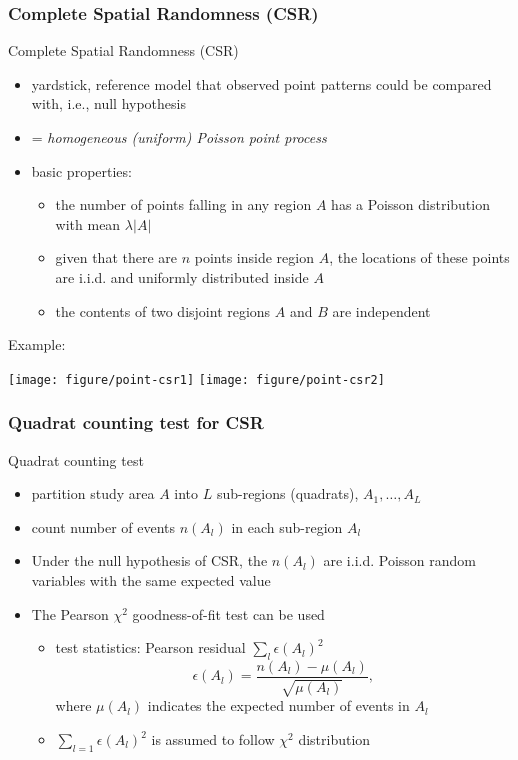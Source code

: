 \documentclass[10pt]{beamer}\usepackage[]{graphicx}\usepackage[]{color}
\newcommand{\bitemize}{\begin{itemize}}
\newcommand{\eitemize}{\end{itemize}}
\newcommand{\bblock}{\begin{block}}
\newcommand{\eblock}{\end{block}}
\begin{document}
\begin{frame}
\frametitle{Complete Spatial Randomness (CSR)}

\bblock{Complete Spatial Randomness (CSR)}
\bitemize
\item yardstick, reference model that observed point patterns could be compared with, i.e., null hypothesis
\item = {\it homogeneous (uniform) Poisson point process} 
\item basic properties:
\bitemize
\item the number of points falling in any region $A$ has a Poisson distribution with mean $\lambda|A|$
\item given that there are $n$ points inside region $A$, the locations of these points are i.i.d. and uniformly distributed inside $A$
\item the contents of two disjoint regions $A$ and $B$ are independent 
\eitemize
\eitemize
\eblock
\bblock{Example:}
\vspace{-0.5cm}


{\centering \texttt{[image: figure/point-csr1]} 
\texttt{[image: figure/point-csr2]} 

}




\eblock

\end{frame}

\begin{frame}
\frametitle{Quadrat counting test for CSR}

\bblock{Quadrat counting test}
\bitemize
\item partition study area $A$ into $L$ sub-regions (quadrats), $A_1, \ldots, A_L$ 
\item count number of events $n(A_l)$ in each sub-region $A_l$
\item Under the null hypothesis of CSR, the $n(A_l)$ are i.i.d. Poisson random variables with the same expected value
\item The Pearson $\chi^2$ goodness-of-fit test can be used 
\bitemize
\item test statistics: Pearson residual $\sum_{l}\epsilon(A_l)^2$
\[
\epsilon(A_l) = \frac{n(A_l) - \mu(A_l)}{\sqrt{{\mu(A_l)}}},
\]
where $\mu(A_l)$ indicates the expected number of events in $A_l$
\item $\sum_{l=1}\epsilon(A_l)^2$ is assumed to follow $\chi^2$ distribution
\eitemize
\eitemize
\eblock
\end{frame}
\end{document}
